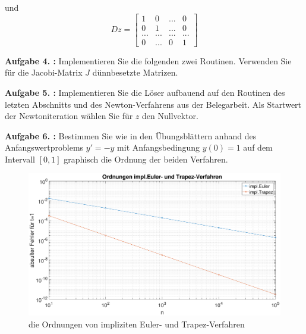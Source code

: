 und 
\begin{equation}
	Dz =
\begin{bmatrix}
	1 & 0 & ... & 0 \\
	0 & 1 & ... & 0 \\
	... & ... & ... & ... \\
	0 & ... & 0 & 1 
\end{bmatrix}  
\end{equation}

\begin{mybox}
	\textbf{Aufgabe 4. :}
	Implementieren Sie die folgenden zwei Routinen. Verwenden Sie für die Jacobi-Matrix $J$ dünnbesetzte
	Matrizen.
\end{mybox}

\begin{figure}[htb]
	
\end{figure}
\begin{figure}[htb]
	
\end{figure}
\clearpage
\begin{mybox}
	\textbf{Aufgabe 5. :}
	Implementieren Sie die Löser aufbauend auf den Routinen des letzten Abschnitts und des Newton-Verfahrens aus der Belegarbeit. Als Startwert der Newtoniteration wählen Sie für $z$ den Nullvektor.
\end{mybox}

\begin{figure}[htb]
	
\end{figure}
\begin{figure}[htb]
	
\end{figure}
\clearpage

\begin{mybox}
	\textbf{Aufgabe 6. :}
	Bestimmen Sie wie in den Übungsblättern anhand des Anfangswertproblems $ y' = -y $ mit Anfangsbedingung $ y(0) = 1 $ auf dem Intervall $ [0,1] $ graphisch die Ordnung der beiden Verfahren.
\end{mybox}

\begin{figure}[h]
	\centering
	\includegraphics[width=1\textwidth]{figures/Impl._3_1_6/Ordnungen_E_T}
	\caption{die Ordnungen von impliziten Euler- und Trapez-Verfahren}
\end{figure}


